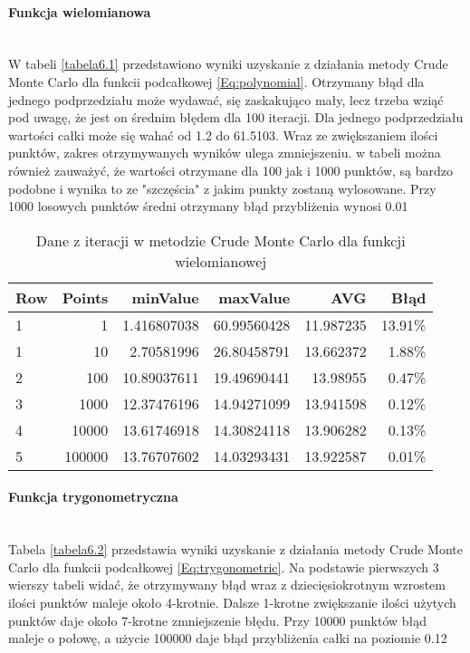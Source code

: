 \documentclass[12pt,twoside]{article}
\begin{document}
\paragraph{Funkcja wielomianowa}\mbox{} \\

W tabeli \eqref{tabela6.1} przedstawiono wyniki uzyskanie z działania metody Crude Monte Carlo dla funkcii podcałkowej \eqref{Eq:polynomial}.
Otrzymany błąd dla jednego podprzedziału może wydawać, się zaskakująco mały, lecz trzeba wziąć pod uwagę, że jest on średnim błędem dla 100 iteracji. Dla jednego podprzedziału wartości całki może się wahać od 1.2 do 61.5103. Wraz ze zwiększaniem ilości punktów, zakres otrzymywanych wyników ulega zmniejszeniu. w tabeli można również zauważyć, że wartości otrzymane dla 100 jak i 1000 punktów, są bardzo podobne i wynika to ze "szczęścia" z jakim punkty zostaną wylosowane.
Przy 1000 losowych punktów średni otrzymany błąd przybliżenia wynosi 0.01%


\begin{table}[H]
\centering 
\caption{Dane z iteracji w metodzie Crude Monte Carlo dla funkcji wielomianowej}
\label{tabela6.1}
\begin{tabular}{lrrrrr}
\toprule
{Row} &  Points &  minValue &  maxValue &       AVG &      Błąd \\
\midrule
1  &     1 & 1.416807038 &   60.99560428 & 11.987235 & 13.91\% \\
1  &     10 & 2.70581996 &   26.80458791 & 13.662372 & 1.88\% \\
2  &     100 & 10.89037611 &  19.49690441 & 13.98955& 0.47\% \\
3  &     1000 & 12.37476196 &   14.94271099 & 13.941598 & 0.12\% \\
4  &     10000 & 13.61746918 &  14.30824118 & 13.906282 & 0.13\% \\
5  &     100000 & 13.76707602 &  14.03293431 & 13.922587 & 0.01\% \\
\bottomrule
\end{tabular}
\end{table}


\paragraph{Funkcja trygonometryczna}\mbox{} \\

Tabela \eqref{tabela6.2} przedstawia wyniki uzyskanie z działania metody Crude Monte Carlo dla funkcii podcałkowej \eqref{Eq:trygonometric}.
Na podstawie pierwszych 3 wierszy tabeli widać, że otrzymywany błąd wraz z dziecięsiokrotnym wzrostem ilości punktów maleje około 4-krotnie.
Dalsze 1-krotne zwiększanie ilości użytych punktów  daje około 7-krotne zmniejszenie błędu. Przy 10000 punktów błąd maleje o połowę, a użycie 100000 daje błąd przybliżenia całki na poziomie 0.12%
\end{document}
